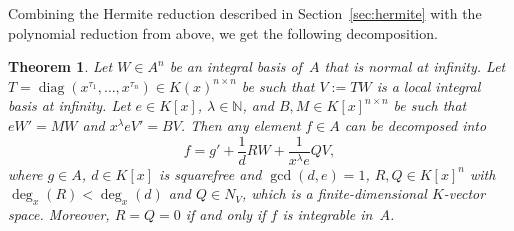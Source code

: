\documentclass{sig-alternate}
\newtheorem{theorem}{Theorem}
\newcommand{\bN}{ {\mathbb N}}
\def\diag{\operatorname{diag}}
\begin{document}
Combining the Hermite reduction described in Section~\ref{sec:hermite}
with the polynomial reduction from above, we get the following decomposition.
\begin{theorem}\label{THM:polyred}
Let $W\in A^n$ be an integral basis of~$A$ that is normal at infinity.
Let $T = \diag(x^{\tau_1}, \ldots, x^{\tau_n}) \in K(x)^{n\times n}$ be such
that $V := TW$ is a local integral basis at infinity.  Let $e\in K[x]$,
$\lambda \in \bN$, and $B, M \in K[x]^{n \times n} $ be such that $eW' = MW$
and $x^\lambda eV' = BV$.  Then any element $f\in A$ can be decomposed into
\begin{equation}\label{EQ:add}
  f = g' + \frac{1}{d} RW + \frac{1}{x^\lambda e} QV,
\end{equation}
where $g\in A$, $d\in K[x]$ is squarefree and $\gcd(d, e)=1$, $R, Q\in K[x]^n$
with $\deg_x(R) < \deg_x(d)$ and $Q\in N_V$, which is a finite-dimensional
$K$-vector space. Moreover, $R=Q=0$ if and only if $f$ is integrable in~$A$.
\end{theorem}
\end{document}

